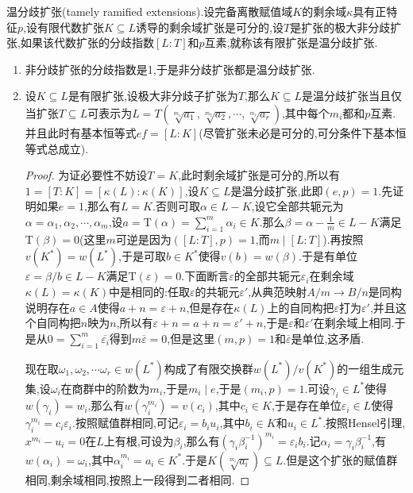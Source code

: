 温分歧扩张(tamely ramified extensions).设完备离散赋值域$K$的剩余域$\kappa$具有正特征$p$,设有限代数扩张$K\subseteq L$诱导的剩余域扩张是可分的,设$T$是扩张的极大非分歧扩张,如果该代数扩张的分歧指数$[L:T]$和$p$互素,就称该有限扩张是温分歧扩张.
\begin{enumerate}
	\item 非分歧扩张的分歧指数是1,于是非分歧扩张都是温分歧扩张.
	\item 设$K\subseteq L$是有限扩张,设极大非分歧子扩张为$T$,那么$K\subseteq L$是温分歧扩张当且仅当扩张$T\subseteq L$可表示为$L=T(\sqrt[m_1]{a_1},\sqrt[m_2]{a_2},\cdots,\sqrt[m_r]{a_r})$,其中每个$m_i$都和$p$互素.并且此时有基本恒等式$ef=[L:K]$(尽管扩张未必是可分的,可分条件下基本恒等式总成立).
	\begin{proof}
		
		为证必要性不妨设$T=K$,此时剩余域扩张是可分的,所以有$1=[T:K]=[\kappa(L):\kappa(K)]$,设$K\subseteq L$是温分歧扩张,此即$(e,p)=1$.先证明如果$e=1$,那么有$L=K$.否则可取$\alpha\in L-K$,设它全部共轭元为$\alpha=\alpha_1,\alpha_2,\cdots,\alpha_m$,设$a=\mathrm{T}(\alpha)=\sum_{i=1}^m\alpha_i\in K$.那么$\beta=\alpha-\frac{1}{m}\in L-K$满足$\mathrm{T}(\beta)=0$(这里$m$可逆是因为$([L:T],p)=1$,而$m\mid [L:T]$).再按照$v(K^*)=w(L^*)$,于是可取$b\in K^*$使得$v(b)=w(\beta)$.于是有单位$\varepsilon=\beta/b\in L-K$满足$\mathrm{T}(\varepsilon)=0$.下面断言$\varepsilon$的全部共轭元$\varepsilon_i$在剩余域$\kappa(L)=\kappa(K)$中是相同的:任取$\varepsilon$的共轭元$\varepsilon'$,从典范映射$A/m\to B/n$是同构说明存在$a\in A$使得$a+n=\varepsilon+n$,但是存在$\kappa(L)$上的自同构把$\varepsilon$打为$\varepsilon'$,并且这个自同构把$n$映为$n$,所以有$\varepsilon+n=a+n=\varepsilon'+n$,于是$\varepsilon$和$\varepsilon'$在剩余域上相同.于是从$0=\sum_{i=1}^m\overline{\varepsilon_i}$得到$m\overline{\varepsilon}=0$,但是这里$(m,p)=1$和$\overline{\varepsilon}$是单位,这矛盾.
		
		\qquad
		
		现在取$\omega_1,\omega_2,\cdots\omega_r\in w(L^*)$构成了有限交换群$w(L^*)/v(K^*)$的一组生成元集,设$\omega_i$在商群中的阶数为$m_i$,于是$m_i\mid e$,于是$(m_i,p)=1$.可设$\gamma_i\in L^*$使得$w(\gamma_i)=w_i$,那么有$w(\gamma_i^{m_i})=v(c_i)$,其中$c_i\in K$,于是存在单位$\varepsilon_i\in L$使得$\gamma_i^{m_i}=c_i\varepsilon_i$.按照赋值群相同,可记$\varepsilon_i=b_iu_i$,其中$b_i\in K$和$u_i\in L^*$.按照Hensel引理,$x^{m_i}-u_i=0$在$L$上有根,可设为$\beta_i$,那么有$(\gamma_i\beta_i^{-1})^{m_i}=\varepsilon_ib_i$.记$\alpha_i=\gamma_i\beta_i^{-1}$,有$w(\alpha_i)=\omega_i$,其中$\alpha_i^{m_i}=a_i\in K^*$.于是$K(\sqrt[m_i]{a_i})\subseteq L$.但是这个扩张的赋值群相同,剩余域相同,按照上一段得到二者相同.
		

\end{proof}
\end{enumerate}
